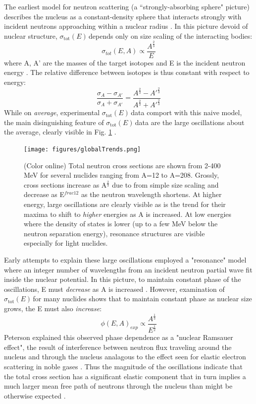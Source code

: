 \documentclass[twocolumn,secnumarabic,amssymb, nobibnotes, aps, prl,
superscriptaddress, nobalancelastpage]{revtex4}
\newcommand{\totEs}{\ensuremath{\sigma_{\text{tot}}(E)\,}}
\begin{document}
The earliest model for neutron scattering (a ``strongly-absorbing sphere" 
picture) describes the nucleus as a constant-density sphere that interacts strongly with 
incident neutrons approaching within a nuclear radius \cite{Feshbach1949}. In this 
picture devoid of nuclear structure, \totEs depends only
on size scaling of the interacting bodies:
\begin{equation} \label{eq1}
    \sigma_{tot}(E,A) \propto \frac{A^{\frac{2}{3}}}{E}
\end{equation}
where A, A' are the masses of the target isotopes and E is the incident neutron energy 
\cite{Fernbach1949, Satchler1980}. The relative difference between isotopes is thus constant with respect to energy:
\begin{equation}
    \frac{\sigma_{A}-\sigma_{A'}}{\sigma_{A}+\sigma_{A'}} =
    \frac{A^{\frac{2}{3}}-A'^{\frac{2}{3}}}{A^{\frac{2}{3}}+A'^{\frac{2}{3}}}
\end{equation}
While on \textit{average}, experimental \totEs data comport with this naive model,
the main disinguishing feature of \totEs data are the large 
oscillations about the average, clearly visible in Fig. \ref{GlobalTrends} 
\cite{McVoy1967, Satchler1980}.

\begin{figure}
    \texttt{[image: figures/globalTrends.png]}
    \caption{(Color online) Total neutron cross sections are shown from 2-400
        MeV for several nuclides ranging from A=12 to A=208. Grossly, cross sections
        increase as A$^{\frac{2}{3}}$ due to from simple size scaling and
        decrease as E$^{frac{1}{2}}$ as the neutron wavelength shortens. At higher energy, large oscillations are clearly
        visible as is the trend for their maxima to shift to \textit{higher} energies as
        A is increased. At low
        energies where the density of states is lower (up to a few MeV below the
        neutron separation energy), resonance structures are visible especially
        for light nuclides.}
    \label{GlobalTrends}
\end{figure}
Early attempts to explain these large oscillations employed a "resonance" model where
an integer number of wavelengths from an incident neutron partial wave fit inside the 
nuclear potential. In this picture, to maintain constant phase of the
oscillations, E must \textit{decrease} as A is increased \cite{Peterson1962, 
Satchler1975}. However, examination of \totEs for many nuclides shows that to
maintain constant phase as nuclear size 
grows, the E must also \textit{increase}:
\begin{equation} \label{eq2}
    \phi(E,A)_{exp} \propto \frac{A^{\frac{1}{3}}}{E^{\frac{1}{2}}}
\end{equation}
Peterson explained this observed phase dependence as a "nuclear Ramsauer effect", the 
result of interference between neutron flux traveling around the nucleus and
through the nucleus analagous to the effect seen for elastic electron scattering
in noble gases \cite{Fernbach1949, Lawson1953, Peterson1962}.
Thus the magnitude of the oscillations indicate that the total cross section has a 
significant elastic component that in turn implies a much larger mean free path of
neutrons through the nucleus than might be otherwise expected \cite{Mohr1955}.
\end{document}
